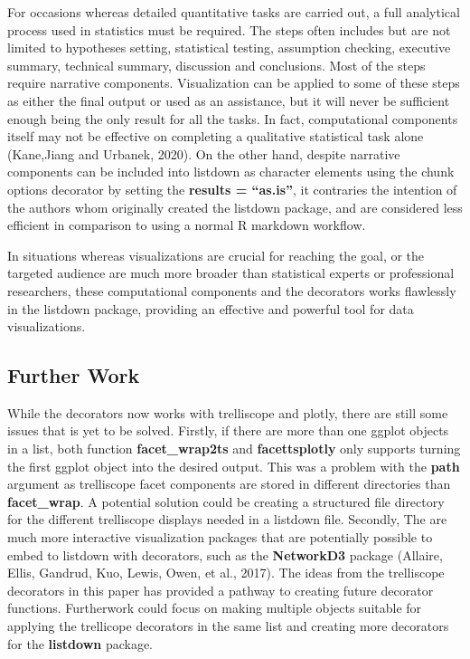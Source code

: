 \documentclass[
]{article}
\begin{document}
For occasions whereas detailed quantitative tasks are carried out, a
full analytical process used in statistics must be required. The steps
often includes but are not limited to hypotheses setting, statistical
testing, assumption checking, executive summary, technical summary,
discussion and conclusions. Most of the steps require narrative
components. Visualization can be applied to some of these steps as
either the final output or used as an assistance, but it will never be
sufficient enough being the only result for all the tasks. In fact,
computational components itself may not be effective on completing a
qualitative statistical task alone (Kane,Jiang and Urbanek, 2020). On
the other hand, despite narrative components can be included into
listdown as character elements using the chunk options decorator by
setting the \textbf{results = ``as.is''}, it contraries the intention of
the authors whom originally created the listdown package, and are
considered less efficient in comparison to using a normal R markdown
workflow.

In situations whereas visualizations are crucial for reaching the goal,
or the targeted audience are much more broader than statistical experts
or professional researchers, these computational components and the
decorators works flawlessly in the listdown package, providing an
effective and powerful tool for data visualizations.

\hypertarget{further-work}{%
\subsection{Further Work}\label{further-work}}

While the decorators now works with trelliscope and plotly, there are
still some issues that is yet to be solved. Firstly, if there are more
than one ggplot objects in a list, both function \textbf{facet\_wrap2ts}
and \textbf{facettsplotly} only supports turning the first ggplot object
into the desired output. This was a problem with the \textbf{path}
argument as trelliscope facet components are stored in different
directories than \textbf{facet\_wrap}. A potential solution could be
creating a structured file directory for the different trelliscope
displays needed in a listdown file. Secondly, The are much more
interactive visualization packages that are potentially possible to
embed to listdown with decorators, such as the \textbf{NetworkD3}
package (Allaire, Ellis, Gandrud, Kuo, Lewis, Owen, et al., 2017). The
ideas from the trelliscope decorators in this paper has provided a
pathway to creating future decorator functions. Furtherwork could focus
on making multiple objects suitable for applying the trellicope
decorators in the same list and creating more decorators for the
\textbf{listdown} package.
\end{document}
